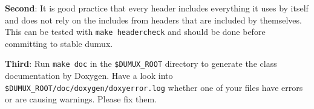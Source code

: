 \textbf{Second}: It is good practice that every header includes everything it uses by itself and does not rely on the includes from headers that are included by themselves. This can be tested with \texttt{make headercheck} and should be done before committing to stable dumux.

\textbf{Third}: Run \texttt{make doc} in the \texttt{\$DUMUX\_ROOT} directory to generate the class documentation by Doxygen. Have a look into \texttt{\$DUMUX\_ROOT/doc/doxygen/doxyerror.log} whether one of your files have errors or are causing warnings. Please fix them.
